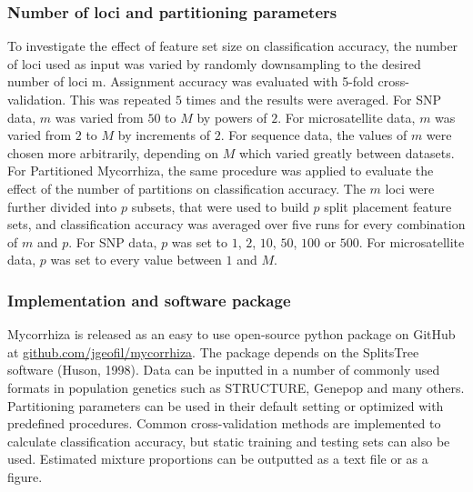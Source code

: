 \documentclass{bioinfo}
\begin{document}
\begin{methods}
\subsubsection{Number of loci and partitioning parameters}
To investigate the effect of feature set size on classification accuracy, the number of loci used as input was varied by randomly downsampling to the desired number of loci m. Assignment accuracy was evaluated with 5-fold cross-validation. This was repeated $5$ times and the results were averaged. For SNP data, $m$ was varied from $50$ to $M$ by powers of $2$. For microsatellite data, $m$ was varied from $2$ to $M$ by increments of $2$. For sequence data, the values of $m$ were chosen more arbitrarily, depending on $M$ which varied greatly between datasets.\\
For Partitioned Mycorrhiza, the same procedure was applied to evaluate the effect of the number of partitions on classification accuracy. The $m$ loci were further divided into $p$ subsets, that were used to build $p$ split placement feature sets, and classification accuracy was averaged over five runs for every combination of $m$ and $p$. For SNP data, $p$ was set to $1$, $2$, $10$, $50$, $100$ or $500$.  For microsatellite data, $p$ was set to every value between $1$ and $M$.
\subsubsection{Implementation and software package}
Mycorrhiza is released as an easy to use open-source python package on GitHub at \underline{github.com/jgeofil/mycorrhiza}. The package depends on the SplitsTree software (Huson, 1998). Data can be inputted in a number of commonly used formats in population genetics such as STRUCTURE, Genepop and many others. Partitioning parameters can be used in their default setting or optimized with predefined procedures. Common cross-validation methods are implemented to calculate classification accuracy, but static training and testing sets can also be used. Estimated mixture proportions can be outputted as a text file or as a figure. 
\end{methods}
\end{document}
